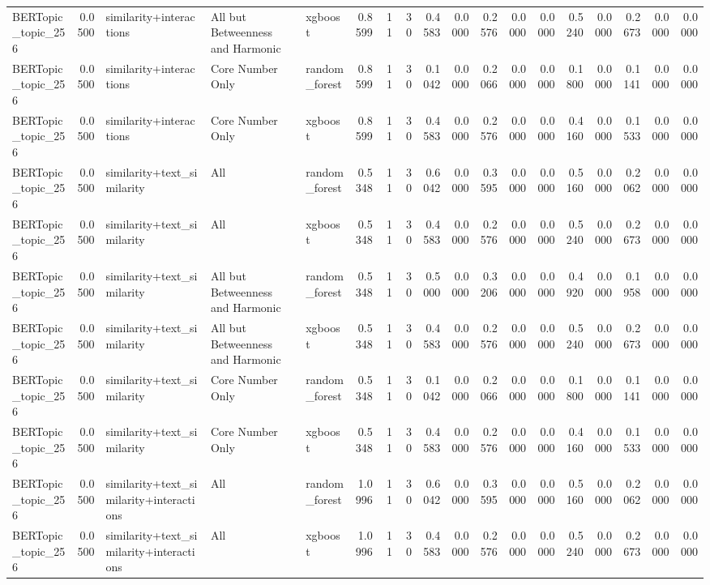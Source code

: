 \begin{tabular}{lrlllrrrrrrrrrrrrr}
BERTopic_topic_256 & 0.0500 & similarity+interactions & All but Betweenness and Harmonic & xgboost & 0.8599 & 11 & 30 & 0.4583 & 0.0000 & 0.2576 & 0.0000 & 0.0000 & 0.5240 & 0.0000 & 0.2673 & 0.0000 & 0.0000 \\
BERTopic_topic_256 & 0.0500 & similarity+interactions & Core Number Only & random_forest & 0.8599 & 11 & 30 & 0.1042 & 0.0000 & 0.2066 & 0.0000 & 0.0000 & 0.1800 & 0.0000 & 0.1141 & 0.0000 & 0.0000 \\
BERTopic_topic_256 & 0.0500 & similarity+interactions & Core Number Only & xgboost & 0.8599 & 11 & 30 & 0.4583 & 0.0000 & 0.2576 & 0.0000 & 0.0000 & 0.4160 & 0.0000 & 0.1533 & 0.0000 & 0.0000 \\
BERTopic_topic_256 & 0.0500 & similarity+text_similarity & All & random_forest & 0.5348 & 11 & 30 & 0.6042 & 0.0000 & 0.3595 & 0.0000 & 0.0000 & 0.5160 & 0.0000 & 0.2062 & 0.0000 & 0.0000 \\
BERTopic_topic_256 & 0.0500 & similarity+text_similarity & All & xgboost & 0.5348 & 11 & 30 & 0.4583 & 0.0000 & 0.2576 & 0.0000 & 0.0000 & 0.5240 & 0.0000 & 0.2673 & 0.0000 & 0.0000 \\
BERTopic_topic_256 & 0.0500 & similarity+text_similarity & All but Betweenness and Harmonic & random_forest & 0.5348 & 11 & 30 & 0.5000 & 0.0000 & 0.3206 & 0.0000 & 0.0000 & 0.4920 & 0.0000 & 0.1958 & 0.0000 & 0.0000 \\
BERTopic_topic_256 & 0.0500 & similarity+text_similarity & All but Betweenness and Harmonic & xgboost & 0.5348 & 11 & 30 & 0.4583 & 0.0000 & 0.2576 & 0.0000 & 0.0000 & 0.5240 & 0.0000 & 0.2673 & 0.0000 & 0.0000 \\
BERTopic_topic_256 & 0.0500 & similarity+text_similarity & Core Number Only & random_forest & 0.5348 & 11 & 30 & 0.1042 & 0.0000 & 0.2066 & 0.0000 & 0.0000 & 0.1800 & 0.0000 & 0.1141 & 0.0000 & 0.0000 \\
BERTopic_topic_256 & 0.0500 & similarity+text_similarity & Core Number Only & xgboost & 0.5348 & 11 & 30 & 0.4583 & 0.0000 & 0.2576 & 0.0000 & 0.0000 & 0.4160 & 0.0000 & 0.1533 & 0.0000 & 0.0000 \\
BERTopic_topic_256 & 0.0500 & similarity+text_similarity+interactions & All & random_forest & 1.0996 & 11 & 30 & 0.6042 & 0.0000 & 0.3595 & 0.0000 & 0.0000 & 0.5160 & 0.0000 & 0.2062 & 0.0000 & 0.0000 \\
BERTopic_topic_256 & 0.0500 & similarity+text_similarity+interactions & All & xgboost & 1.0996 & 11 & 30 & 0.4583 & 0.0000 & 0.2576 & 0.0000 & 0.0000 & 0.5240 & 0.0000 & 0.2673 & 0.0000 & 0.0000 \\

\end{tabular}
